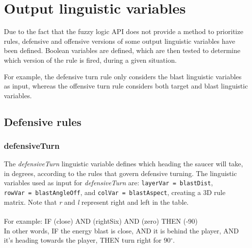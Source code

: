 \section{Output linguistic variables}

Due to the fact that the fuzzy logic API does not provide a method to prioritize rules, defensive and offensive versions of some output linguistic variables have been defined. Boolean variables are defined, which are then tested to determine which version of the rule is fired, during a given situation.

For example, the defensive turn rule only considers the blast linguistic variables as input, whereas the offensive turn rule considers both target and blast linguistic variables.

\subsection{Defensive rules}

\subsubsection{defensiveTurn}

The \emph{defensiveTurn} linguistic variable defines which heading the saucer will take, in degrees, according to the rules that govern defensive turning. The linguistic variables used as input for \emph{defensiveTurn} are: \texttt{layerVar = blastDist}, \\ \texttt{rowVar = blastAngleOff}, and \texttt{colVar = blastAspect}, creating a 3D rule matrix. Note that \emph{r} and \emph{l} represent right and left in the table.
\\
\\
For example: IF (close) AND (rightSix) AND (zero) THEN (-90) \\
In other words, IF the energy blast is close, AND it is behind the player, AND it's heading towards the player, THEN turn right for 90$^{\circ}$.

